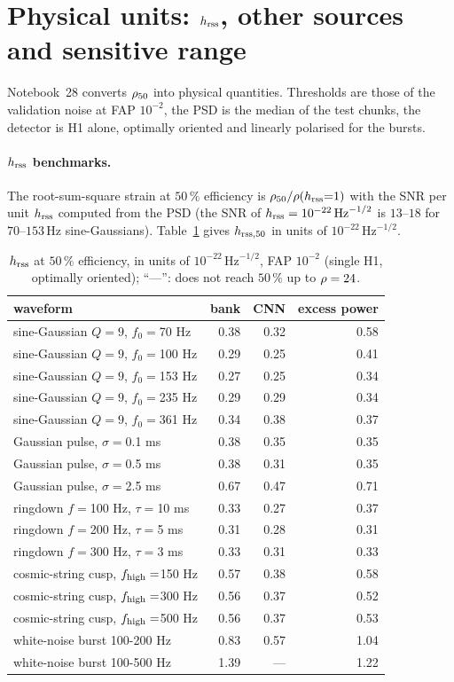 \section{Physical units: $h_{\rm rss}$, other sources and sensitive range}\label{sec:physical}
Notebook~28 converts $\rho_{50}$ into physical quantities. Thresholds are those of the validation noise at FAP $10^{-2}$, the PSD is the median of the test chunks, the detector is H1 alone, optimally oriented and linearly polarised for the bursts.
\paragraph{$h_{\rm rss}$ benchmarks.} The root-sum-square strain at $50\,\%$ efficiency is $\rho_{50}/\rho(h_{\rm rss}{=}1)$ with the SNR per unit $h_{\rm rss}$ computed from the PSD (the SNR of $h_{\rm rss}=10^{-22}\,\mathrm{Hz}^{-1/2}$ is $13$--$18$ for $70$--$153\,$Hz sine-Gaussians). Table~\ref{tab:hrss} gives $h_{\rm rss,50}$ in units of $10^{-22}\,\mathrm{Hz}^{-1/2}$.
\begin{table}[h]\centering\small
\begin{tabular}{lrrr}
\toprule
waveform & bank & CNN & excess power\\
\midrule
sine-Gaussian $Q=9$, $f_0=$70 Hz & 0.38 & 0.32 & 0.58\\
sine-Gaussian $Q=9$, $f_0=$100 Hz & 0.29 & 0.25 & 0.41\\
sine-Gaussian $Q=9$, $f_0=$153 Hz & 0.27 & 0.25 & 0.34\\
sine-Gaussian $Q=9$, $f_0=$235 Hz & 0.29 & 0.29 & 0.34\\
sine-Gaussian $Q=9$, $f_0=$361 Hz & 0.34 & 0.38 & 0.37\\
Gaussian pulse, $\sigma=$0.1 ms & 0.38 & 0.35 & 0.35\\
Gaussian pulse, $\sigma=$0.5 ms & 0.38 & 0.31 & 0.35\\
Gaussian pulse, $\sigma=$2.5 ms & 0.67 & 0.47 & 0.71\\
ringdown $f=$100 Hz, $\tau=$10 ms & 0.33 & 0.27 & 0.37\\
ringdown $f=$200 Hz, $\tau=$5 ms & 0.31 & 0.28 & 0.31\\
ringdown $f=$300 Hz, $\tau=$3 ms & 0.33 & 0.31 & 0.33\\
cosmic-string cusp, $f_{\rm high}=$150 Hz & 0.57 & 0.38 & 0.58\\
cosmic-string cusp, $f_{\rm high}=$300 Hz & 0.56 & 0.37 & 0.52\\
cosmic-string cusp, $f_{\rm high}=$500 Hz & 0.56 & 0.37 & 0.53\\
white-noise burst 100-200 Hz & 0.83 & 0.57 & 1.04\\
white-noise burst 100-500 Hz & 1.39 & --- & 1.22\\
\bottomrule
\end{tabular}
\caption{$h_{\rm rss}$ at $50\,\%$ efficiency, in units of $10^{-22}\,\mathrm{Hz}^{-1/2}$, FAP $10^{-2}$ (single H1, optimally oriented); ``---'': does not reach $50\,\%$ up to $\rho=24$.}\label{tab:hrss}
\end{table}

